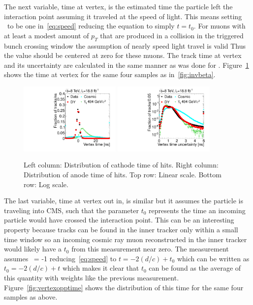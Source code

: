 The next variable, time at vertex, is the estimated time the particle 
left the interaction point assuming it traveled at the speed of light.
This means setting \invbeta\ to be one in~\ref{eq:speed} reducing the equation to simply $t = t_0$. 
For muons with at least a modest amount of $p_T$ that are produced in a collision in the triggered bunch crossing window the assumption of nearly speed light travel is valid
Thus the value should be centered at zero for these muons.
The track time at vertex and its uncertainty are calculated in the same manner as was done for \invbeta.
Figure~\ref{fig:vertextime} shows the time at vertex for the same four samples as in~\ref{fig:invbeta}.

\begin{figure}
  \begin{center}
      \includegraphics[width=0.44\textwidth]{figures/timing/Vertex}
      \includegraphics[width=0.44\textwidth]{figures/timing/VertexErr} \\
      \renewcommand\baselinestretch{1}\caption[Gluino1200f100 System Pt vs MET]
      {Left column: Distribution of cathode time of hits. Right column: Distribution of anode time of hits. Top row: Linear scale. Bottom row: Log scale.
        }
      \renewcommand\baselinestretch{\@spacing}
      \label{fig:vertextime}
  \end{center}
\end{figure}

The last variable, time at vertex out in, is similar but it assumes the particle is traveling into CMS, such that the parameter $t_0$ represents the time an incoming particle
would have crossed the interaction point. This can be an interesting property because tracks can be found in the inner tracker only within a small time window so an incoming
cosmic ray muon reconstructed in the inner tracker would likely have a $t_0$ from this measurement near zero. 
The measurement assumes \invbeta\ = -1 reducing~\ref{eq:speed} to $t = -2 (d / c) + t_0$ which can be written as $t_0 = -2 (d / c) + t$ which makes it clear that
$t_0$ can be found as the average of this quantity with weights like the previous measurement. Figure~\ref{fig:vertexopptime} shows the distribution of this time
for the same four samples as above.


